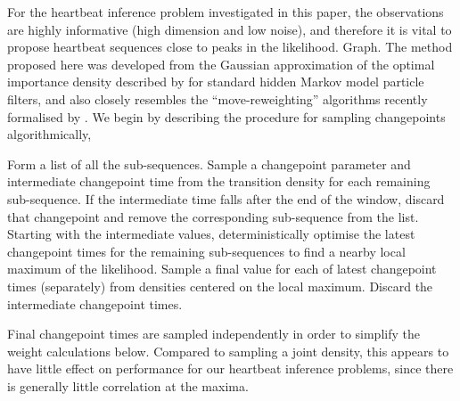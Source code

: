 \documentclass{article}
\begin{document}
For the heartbeat inference problem investigated in this paper, the observations are highly informative (high dimension and low noise), and therefore it is vital to propose heartbeat sequences close to peaks in the likelihood. {\meta Graph.} The method proposed here was developed from the Gaussian approximation of the optimal importance density described by \citet{Doucet2000a} for standard hidden Markov model particle filters, and also closely resembles the ``move-reweighting'' algorithms recently formalised by \citet{Marques2013}. We begin by describing the procedure for sampling changepoints algorithmically,
%
\begin{algorithmic}[1]
  \STATE Form a list of all the sub-sequences.
    \STATE Sample a changepoint parameter and intermediate changepoint time from the transition density for each remaining sub-sequence.
    \STATE If the intermediate time falls after the end of the window, discard that changepoint and remove the corresponding sub-sequence from the list.
    \STATE Starting with the intermediate values, deterministically optimise the latest changepoint times for the remaining sub-sequences to find a nearby local maximum of the likelihood.
    \STATE Sample a final value for each of latest changepoint times (separately) from densities centered on the local maximum.
    \STATE Discard the intermediate changepoint times.
  \ENDWHILE
\end{algorithmic}
%
Final changepoint times are sampled independently in order to simplify the weight calculations below. Compared to sampling a joint density, this appears to have little effect on performance for our heartbeat inference problems, since there is generally little correlation at the maxima.
\end{document}
